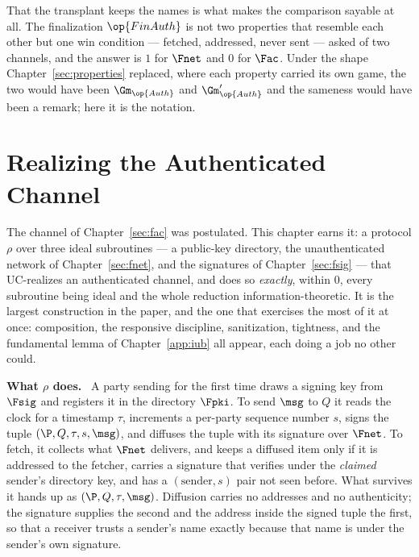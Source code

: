 \documentclass[10pt,oneside,openany]{book}
\newcommand{\heading}[1]{\medskip\par\noindent\textcolor{accent}{\textbf{#1.}}\ }
\theoremstyle{accentdef}
\theoremstyle{accentplain}
\begin{document}
That the transplant keeps the names is what makes the comparison sayable at all. The finalization $\op{FinAuth}$
is not two properties that resemble each other but one win condition --- fetched, addressed, never
sent --- asked of two channels, and the answer is $1$ for $\Fnet$ and $0$ for $\Fac$. Under the
shape Chapter~\ref{sec:properties} replaced, where each property carried its own game, the two
would have been $\Gm_{\op{Auth}}$ and $\Gm_{\op{Auth}}'$ and the sameness would have been a remark;
here it is the notation.

\chapter{Realizing the Authenticated Channel}\label{sec:realac}

The channel of Chapter~\ref{sec:fac} was postulated. This chapter earns it: a protocol $\rho$
over three ideal subroutines --- a public-key directory, the unauthenticated network of
Chapter~\ref{sec:fnet}, and the signatures of Chapter~\ref{sec:fsig} --- that UC-realizes an
authenticated channel, and does so \emph{exactly}, within $0$, every subroutine being ideal and
the whole reduction information-theoretic. It is the largest construction in the paper, and the
one that exercises the most of it at once: composition, the responsive discipline, sanitization,
tightness, and the fundamental lemma of Chapter~\ref{app:iub} all appear, each doing a job no
other could.

\heading{What $\rho$ does} A party sending for the first time draws a signing key from $\Fsig$ and
registers it in the directory $\Fpki$. To send $\msg$ to $Q$ it reads the clock for a timestamp
$\tau$, increments a per-party sequence number $s$, signs the tuple $(\P,Q,\tau,s,\msg)$, and
diffuses the tuple with its signature over $\Fnet$. To fetch, it collects what $\Fnet$ delivers,
and keeps a diffused item only if it is addressed to the fetcher, carries a signature that
verifies under the \emph{claimed} sender's directory key, and has a $(\text{sender},s)$ pair not
seen before. What survives it hands up as $(\P,Q,\tau,\msg)$. Diffusion carries no addresses and
no authenticity; the signature supplies the second and the address inside the signed tuple the
first, so that a receiver trusts a sender's name exactly because that name is under the sender's
own signature.
\end{document}
